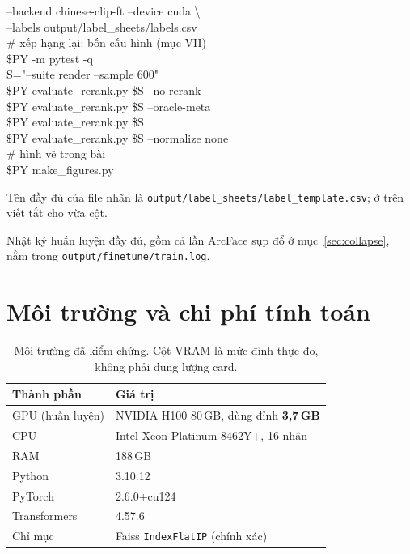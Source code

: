 \documentclass[conference,a4paper]{IEEEtran}
\newcommand{\code}[1]{{\small\texttt{#1}}}
\begin{document}
{\hspace*{1em}--backend chinese-clip-ft --device cuda \textbackslash\\
\hspace*{1em}--labels output/label\_sheets/labels.csv\\[4pt]
\# xếp hạng lại: bốn cấu hình (mục VII)\\
\$PY -m pytest -q\\
S="--suite render --sample 600"\\
\$PY evaluate\_rerank.py \$S --no-rerank\\
\$PY evaluate\_rerank.py \$S --oracle-meta\\
\$PY evaluate\_rerank.py \$S\\
\$PY evaluate\_rerank.py \$S --normalize none\\[4pt]
\# hình vẽ trong bài\\
\$PY make\_figures.py\\
}

{\sloppy Tên đầy đủ của file nhãn là \code{output/label\_sheets/label\_template.csv}; ở trên viết
tắt cho vừa cột.\par} Nhật ký huấn luyện đầy đủ, gồm cả lần ArcFace sụp đổ ở mục~\ref{sec:collapse}, nằm trong
\code{output/finetune/train.log}.

\section{Môi trường và chi phí tính toán}
\label{app:env}

\begin{table}[h]
\caption{Môi trường đã kiểm chứng. Cột VRAM là mức đỉnh thực đo, không phải dung lượng card.}
\label{tab:env}
\centering\footnotesize
\begin{tabular}{@{}ll@{}}
\toprule
Thành phần & Giá trị \\
\midrule
GPU (huấn luyện) & NVIDIA H100 80\,GB, dùng đỉnh \textbf{3,7\,GB} \\
CPU & Intel Xeon Platinum 8462Y+, 16 nhân \\
RAM & 188\,GB \\
Python & 3.10.12 \\
PyTorch & 2.6.0+cu124 \\
Transformers & 4.57.6 \\
Chỉ mục & Faiss \code{IndexFlatIP} (chính xác) \\
\bottomrule
\end{tabular}
\end{table}
\end{document}
